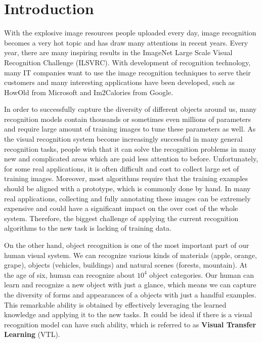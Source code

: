 \chapter{Introduction}\label{sec:intro}
With the explosive image resources people uploaded every day, image recognition becomes a very hot topic and has draw many attentions in recent years. Every year, there are many inspiring results in the ImageNet Large Scale Visual Recognition Challenge (ILSVRC). 
With development of recognition technology, many IT companies want to use the image recognition techniques to serve their customers and many interesting applications have been developed, such as HowOld from Microsoft and Im2Calories from Google.

In order to successfully capture the diversity of different objects around us, many recognition models contain thousands or sometimes even millions of parameters and require large amount of training images to tune these parameters as well.
As the visual recognition system become increasingly successful in many general recognition tasks, people wish that it can solve the recognition problems in many new and complicated areas which are paid less attention to before.
Unfortunately, for some real applications, it is often difficult and cost to collect large set of training images. Moreover, most algorithms require that the training examples should be aligned with a prototype, which is commonly done by hand. In many real applications, collecting and fully annotating these images can be extremely expensive and could have a significant impact on the over cost of the whole system.
Therefore, the biggest challenge of applying the current recognition algorithms to the new task is lacking of training data.

On the other hand, object recognition is one of the most important part of our human visual system. We can recognize various kinds of materials (apple, orange, grape), objects (vehicles, buildings) and natural scenes (forests, mountain). At the age of six, human can recognize about $10^4$ object categories\cite{biederman1987recognition}. 
Our human can learn and recognize a new object with just a glance, which means we can capture the diversity of forms and appearances of a objects with just a handful examples. This remarkable ability is obtained by effectively leveraging the learned knowledge and applying it to the new tasks. It could be ideal if there is a visual recognition model can have such ability, which is referred to as \textbf{Visual Transfer Learning} (VTL). 

